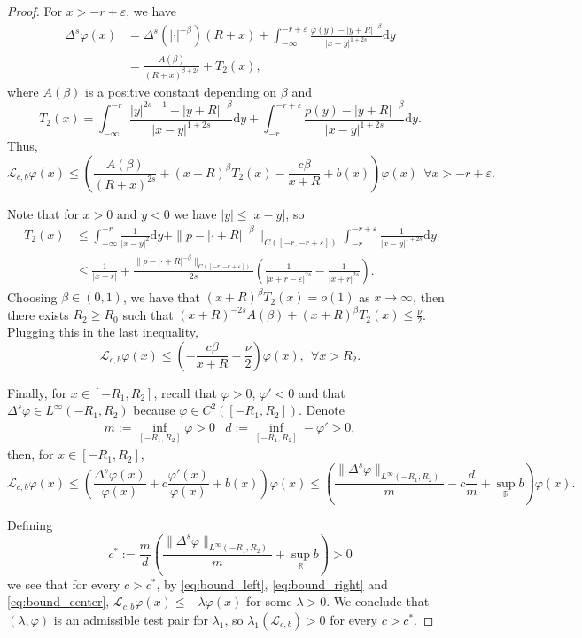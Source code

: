\documentclass[10pt,a4paper]{amsart}
\newcommand{\Lop}{\mathcal{L}}
\newcommand{\R}{\mathbb{R}}
\newcommand{\dy}{\mathrm{d}y}
\renewcommand{\epsilon}{\varepsilon}
\renewcommand{\phi}{\varphi}
\begin{document}
\begin{proof}
For $x > -r +\epsilon$, we have
\begin{align*}
\Delta^s \phi(x) &= \Delta^s(|\cdot|^{-\beta}) (R+x) + \int_{-\infty}^{-r+\epsilon} \frac{\phi(y) - |y+R|^{-\beta}}{|x-y|^{1+2s}}\dy\\
&= \frac{A(\beta)}{(R+x)^{\beta + 2s}} + T_2(x),
\end{align*}
where $A(\beta)$ is a positive constant depending on $\beta$ and
\[T_2(x) = \int_{-\infty}^{-r} \frac{|y|^{2s-1} -|y+R|^{-\beta} }{|x-y|^{1+2s}}\dy + \int_{-r}^{-r+\epsilon}\frac{p(y) - |y+R|^{-\beta}}{|x-y|^{1+2s}}\dy.\]
Thus,
\[\Lop_{c,b} \phi(x) \leq \left( \frac{A(\beta)}{(R+x)^{2s}} + (x+R)^{\beta} T_2(x) - \frac{c \beta}{x + R} + b(x)\right)\phi(x) ~~\forall x>-r+\epsilon.\]

Note that for $x>0$ and $y<0$ we have $|y| \leq |x-y|$, so  
\begin{align*}
T_2(x) &\leq \int_{-\infty}^{-r} \frac{1}{|x-y|^2} \dy + \|p-|\cdot +R|^{-\beta}\|_{C([-r, -r+\epsilon])}\int_{-r}^{-r+\epsilon}\frac{1}{|x-y|^{1+2s}}\dy \\
&\leq \frac{1}{|x+r|} + \frac{\|p-|\cdot +R|^{-\beta}\|_{C([-r, -r+\epsilon])}}{2s} \left( \frac{1}{|x+r-\epsilon|^{2s}} - \frac{1}{|x+r|^{2s}}\right).
\end{align*}
Choosing $\beta \in (0,1)$, we have that $(x+R)^{\beta} T_2(x) = o(1)$ as $x\rightarrow \infty$, then there exists $R_2 \geq R_0$ such that $(x+R)^{-2s}A(\beta) + (x+R)^{\beta} T_2(x) \leq \frac{\nu}{2}$. Plugging this in the last inequality,
\begin{equation}
\label{eq:bound_right}
\Lop_{c,b} \phi(x) \leq \left( - \frac{c \beta}{x + R} -\frac{\nu}{2} \right)\phi(x),~~ \forall x > R_2.
\end{equation}

Finally, for $x\in [-R_1, R_2]$, recall that $\phi >0$, $\phi' <0$ and that $\Delta^s\phi\in L^{\infty}(-R_1, R_2)$ because $\phi\in C^2([-R_1, R_2])$. Denote 
\[\begin{array}{cc}
m:= \inf_{[-R_1, R_2]} \phi > 0 & d := \inf_{[-R_1, R_2]} -\phi' >0,
\end{array}\]
then, for $x\in[-R_1,R_2]$,
\begin{equation}
\label{eq:bound_center}
\Lop_{c,b}\phi(x) \leq \left(\frac{\Delta^s \phi(x)}{\phi(x)} + c\frac{\phi'(x)}{\phi(x)} + b(x) \right) \phi(x) \leq \left(\frac{\|\Delta^s\phi\|_{L^{\infty}(-R_1, R_2)}}{m} - c\frac{d}{m} + \sup_{\R} b\right) \phi(x).
\end{equation}

Defining
\[c^*:= \frac{m}{d}\left(\frac{\|\Delta^s\phi\|_{L^{\infty}(-R_1, R_2)}}{m} + \sup_{\R} b\right)>0\]
we see that for every $c>c^*$, by \eqref{eq:bound_left}, \eqref{eq:bound_right} and \eqref{eq:bound_center}, $\Lop_{c,b} \phi(x) \leq -\lambda \phi(x)$ for some $\lambda >0$. We conclude that $(\lambda, \phi)$ is an admissible test pair for $\lambda_1$, so $\lambda_1(\Lop_{c,b})>0$ for every $c>c^*$. 
\end{proof}
\end{document}
